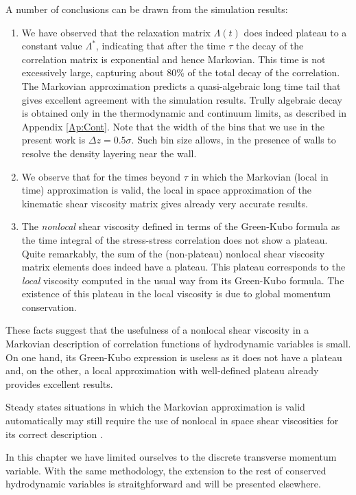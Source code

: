 \documentclass[a4paper,openright,12pt]{book}
\begin{document}
A number of conclusions can be drawn from the simulation results:
\begin{enumerate}
\item We  have observed that  the relaxation matrix  $\Lambda(t)$ does
  indeed  plateau to  a  constant value  $\Lambda^*$, indicating  that
  after  the  time $\tau$  the  decay  of  the correlation  matrix  is
  exponential  and  hence Markovian. This  time  is not  excessively
    large, capturing about  80\% of the total decay  of the correlation.
  The  Markovian approximation  predicts a  quasi-algebraic long  time
  tail  that gives  excellent agreement  with the  simulation results.
  Trully algebraic  decay is  obtained only  in the  thermodynamic and
  continuum limits, as described  in Appendix \ref{Ap:Cont}. Note that
  the width  of the bins  that we use in  the present work  is $\Delta
  z=0.5\sigma$.  Such bin  size allows,  in the  presence of  walls to
  resolve the density layering near the wall.
\item  We observe  that  for  the times  beyond  $\tau$  in which  the
  Markovian (local in time) approximation is valid, the local in space
  approximation of the kinematic  shear viscosity matrix gives already
  very accurate results.
\item The \textit{nonlocal}  shear viscosity defined in  terms of the
  Green-Kubo  formula  as  the  time  integral  of  the  stress-stress
  correlation does  not show a  plateau. Quite remarkably, the  sum of
  the  (non-plateau) nonlocal  shear viscosity  matrix elements  does
  indeed   have  a   plateau.    This  plateau   corresponds  to   the
  \textit{local}  viscosity  computed  in   the  usual  way  from  its
  Green-Kubo  formula. The  existence  of this  plateau  in the  local
  viscosity is due to global momentum conservation.
\end{enumerate}
These facts suggest that the usefulness of a nonlocal shear viscosity
in a  Markovian description  of correlation functions  of hydrodynamic
variables is small.  On one hand, its Green-Kubo expression is useless
as it does not have a plateau and, on the other, a local approximation
with well-defined plateau already provides excellent results.

Steady states situations in which the Markovian approximation is valid
automatically may  still require the  use of nonlocal in  space shear
viscosities for its correct description \cite{.}.

In  this chapter  we  have  limited  ourselves to  the  discrete
transverse  momentum   variable.   With  the  same   methodology,  the
extension  to   the  rest  of  conserved   hydrodynamic  variables  is
straitghforward and will be presented elsewhere. 
\end{document}
